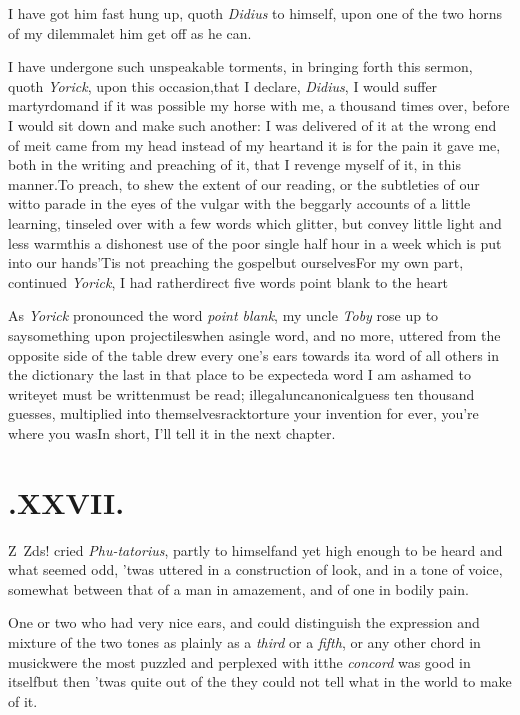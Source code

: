 \documentclass{article}
\begin{document}
\tsk I have got him fast hung up, quoth \textit{Didius}
to himself, upon one of the two horns of my
dilemma\tsh let him get off as he can.

\newpage
I have undergone such unspeakable torments, in bringing
forth this sermon, quoth \textit{Yorick}, upon this
occasion,\tsk that I declare, \textit{Didius}, I would suffer
martyrdom\tsk and if it was possible my horse with me, a
thousand times over, before I would sit down and make such
another: I was delivered of it at the wrong end of me\tsk it
came from my head instead of my heart\tsk and it is for the
pain it gave me, both in the writing and preaching of it,
that I revenge myself of it, in this manner.\tsk To preach,
to shew the extent of our reading, or the subtleties of our
wit\tsk to parade in the eyes of the vulgar with the
beggarly accounts of a little learning, tinseled over with a
few words which glitter, but convey little light and less
warmth\tsk is a dishonest use of the poor single half hour
in a week which is put into our hands\tsk ’Tis not
preaching\pb
the gospel\tsk but ourselves\tsk For my own part, continued
\textit{Yorick}, I had rather\break direct five words point blank
to the\break 
heart\tsk

As \textit{Yorick} pronounced the word \textit{point blank},
my uncle \textit{Toby} rose up to say\break something upon
projectiles\tsh when a\break single word, and no more, uttered
from the opposite side of the table drew every one’s ears
towards it\tsk a word of all others in the dictionary the
last in that place to be expected\tsk a word I am ashamed to
write\tsk yet must be written\tsk must be read;\tsk
illegal\tsk uncanonical\tsk guess ten thousand guesses,
multiplied into themselves\tsk rack\tsk torture your
invention for ever, you’re where you was\tsk\break In short,
I’ll tell it in the next chapter.

\newpage
\null\smallskip
\section{.\enspace XXVII.}

\lettrine{Z}{\,}\tsh\tsh\break
\tsh\tsh\tsh\tsh\tsk\break
\tsh\tsh\tsk Z\tsh ds!  cried \textit{Phu-\break tatorius},
partly to himself\tsk and yet high enough to be heard\tsk
and what seemed odd, ’twas uttered in a construction of
look, and in a tone of voice, somewhat between that of a man
in amazement,\break
and of one in bodily pain.

One or two who had very nice ears, and could distinguish the
expression and mixture of the two tones as plainly as a
\textit{third} or a \textit{fifth}, or any other chord in musick\tsk were the most puzzled and perplexed
with it\tsk the \textit{concord} was good in itself\tsk but then
’twas quite out of the\pb
{}
they could not tell what in the world to make of it.
\end{document}
